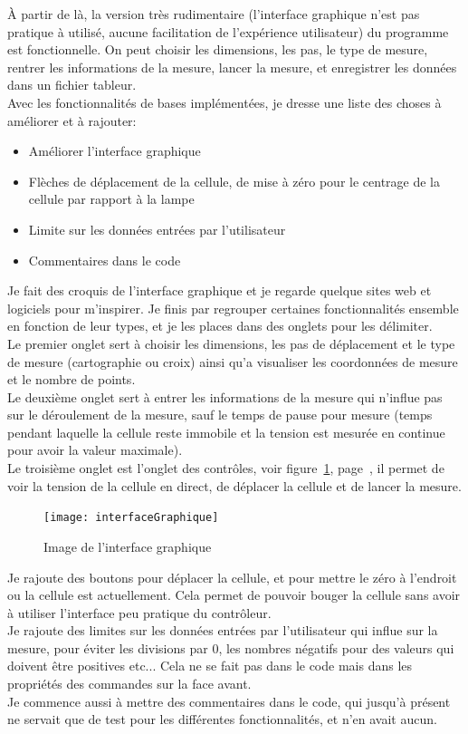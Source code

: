 \documentclass[12pt]{article}
\begin{document}
À partir de là, la version très rudimentaire (l'interface graphique n'est pas pratique à utilisé, aucune facilitation de l'expérience utilisateur) du programme est fonctionnelle.
On peut choisir les dimensions, les pas, le type de mesure, rentrer les informations de la mesure, lancer la mesure, et enregistrer les données dans un fichier tableur.\\
Avec les fonctionnalités de bases implémentées, je dresse une liste des choses à améliorer et à rajouter:
\begin{itemize}
	\item Améliorer l'interface graphique
	\item Flèches de déplacement de la cellule, de mise à zéro pour le centrage de la cellule par rapport à la lampe
	\item Limite sur les données entrées par l'utilisateur
	\item Commentaires dans le code
\end{itemize}
Je fait des croquis de l'interface graphique et je regarde quelque sites web et logiciels pour m'inspirer.
Je finis par regrouper certaines fonctionnalités ensemble en fonction de leur types, et je les places dans des onglets pour les délimiter.\\
Le premier onglet sert à choisir les dimensions, les pas de déplacement et le type de mesure (cartographie ou croix) ainsi qu'a visualiser les coordonnées de mesure et le nombre de points.\\
Le deuxième onglet sert à entrer les informations de la mesure qui n'influe pas sur le déroulement de la mesure, sauf le temps de pause pour mesure (temps pendant laquelle la cellule reste immobile et la tension est mesurée en continue pour avoir la valeur maximale).\\
Le troisième onglet est l'onglet des contrôles, voir figure~\ref{fig:interfaceGraphique}, page~\pageref{fig:interfaceGraphique}, il permet de voir la tension de la cellule en direct, de déplacer la cellule et de lancer la mesure.
\begin{figure}[h]
	\centering
	\texttt{[image: interfaceGraphique]}
	\caption{Image de l'interface graphique}
	\label{fig:interfaceGraphique}
\end{figure}
Je rajoute des boutons pour déplacer la cellule, et pour mettre le zéro à l'endroit ou la cellule est actuellement.
Cela permet de pouvoir bouger la cellule sans avoir à utiliser l'interface peu pratique du contrôleur.\\
Je rajoute des limites sur les données entrées par l'utilisateur qui influe sur la mesure, pour éviter les divisions par 0, les nombres négatifs pour des valeurs qui doivent être positives etc... Cela ne se fait pas dans le code mais dans les propriétés des commandes sur la face avant.\\
Je commence aussi à mettre des commentaires dans le code, qui jusqu'à présent ne servait que de test pour les différentes fonctionnalités, et n'en avait aucun.
\end{document}
